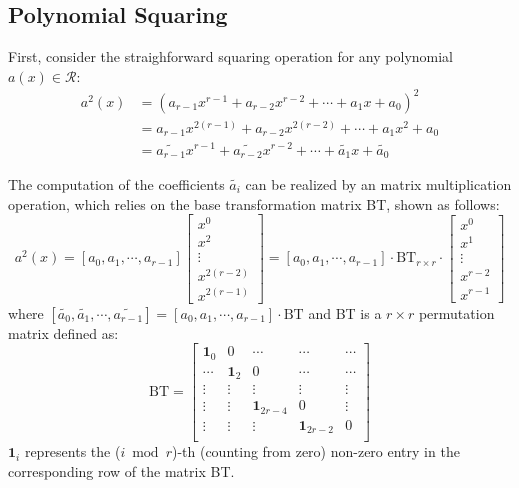 \documentclass[runningheads]{llncs}
\begin{document}
\subsection{Polynomial Squaring}
\label{sub::square}
First, consider the straighforward squaring operation for any polynomial $a(x)\in \mathcal{R}$:
\begin{align}
    a^2(x) &= (a_{r-1}x^{r-1}+a_{r-2}x^{r-2}+\cdots + a_{1}x + a_0)^2\\
    &= a_{r-1}x^{2(r-1)}+a_{r-2}x^{2(r-2)}+\cdots + a_1x^2 + a_0\\
    &= \widetilde{a_{r-1}}x^{r-1}+\widetilde{a_{r-2}}x^{r-2}+\cdots + \widetilde{a_{1}}x +\widetilde{a_0}
\end{align}

The computation of the coefficients $\widetilde{a_{i}}$ can
be realized by an matrix multiplication operation,
which relies on the base transformation matrix BT, shown as follows:
\[
a^2(x)= [{a_{0}},{a_{1}},\cdots,{a_{r-1}}]\left[ \begin{array}{c}
x^{0} \\
x^{2} \\
\vdots\\
x^{2(r-2)}\\
x^{2(r-1)}
\end{array}
\right ]
=
[{a_0},{a_1},\cdots,{a_{r-1}}]
\cdot \text{BT}_{r\times r} \cdot
\left[ \begin{array}{c}
x^{0} \\
x^{1} \\
\vdots\\
x^{r-2}\\
x^{r-1}
\end{array}
\right ]
\]
where $[\widetilde{a_{0}},\widetilde{a_{1}},\cdots,\widetilde{a_{r-1}}]=[{a_{0}},{a_{1}},\cdots,{a_{r-1}}]
\cdot \text{BT}$ and BT is a $r\times r$ permutation matrix defined as:
\[
\text{BT} =
\left[ \begin{array}{ccccc}
\mathbf{1}_{0}&0&\cdots&\cdots&\cdots  \\
\cdots&\mathbf{1}_{2}&0 &\cdots&\cdots \\
\vdots&\vdots&\vdots&\vdots&\vdots\\
\vdots&\vdots&\mathbf{1}_{2r-4}&0&\vdots\\
\vdots&\vdots&\vdots&\mathbf{1}_{2r-2}&0\\
\end{array}
\right ]
\]
$\mathbf{1}_{i}$ represents the ($i\bmod r$)-th (counting from zero) non-zero entry in the corresponding row of the matrix BT.
\end{document}

